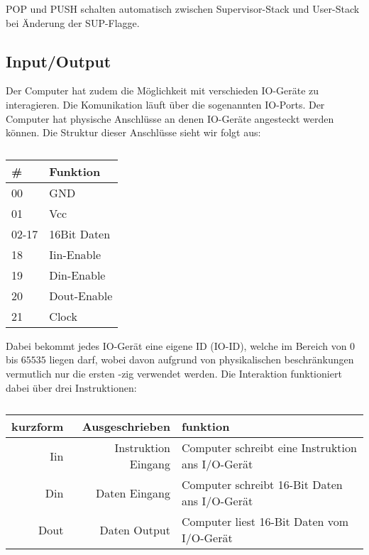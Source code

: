 \documentclass{scrartcl}
\begin{document}
POP und PUSH schalten automatisch zwischen Supervisor-Stack und User-Stack bei Änderung der SUP-Flagge.



\subsection{\label{section:io}Input/Output}

Der Computer hat zudem die Möglichkeit mit verschieden IO-Geräte zu interagieren.
Die Komunikation läuft über die sogenannten IO-Ports.
Der Computer hat physische Anschlüsse an denen IO-Geräte angesteckt werden können.
Die Struktur dieser Anschlüsse sieht wir folgt aus:

\begin{center}
	\begin{table}[h]
		\caption{\label{table:IOPins}}
		\begin{tabular}{l | l}
			\# & Funktion \\
			\hline
			00 & GND \\
			01 & Vcc \\
			02-17 & 16Bit Daten \\
			18 & Iin-Enable \\
			19 & Din-Enable \\
			20 & Dout-Enable \\
			21 & Clock
 		\end{tabular}
	\end{table}
\end{center}

Dabei bekommt jedes IO-Gerät eine eigene ID (IO-ID), welche im Bereich von $0$ bis $65535$ liegen darf, wobei davon aufgrund von physikalischen beschränkungen vermutlich nur die ersten -zig verwendet werden.
Die Interaktion funktioniert dabei über drei Instruktionen:

\begin{center}
	\begin{table}[h]
		\caption{\label{table:IOInstructions}}
		\begin{tabular}{r | r | l}
			kurzform & Ausgeschrieben & funktion \\
			\hline
			Iin & Instruktion Eingang & Computer schreibt eine Instruktion ans I/O-Gerät \\
			Din & Daten Eingang & Computer schreibt 16-Bit Daten ans I/O-Gerät \\
			Dout &  Daten Output & Computer liest 16-Bit Daten vom I/O-Gerät
 		\end{tabular}
	\end{table}
\end{center}
\end{document}
